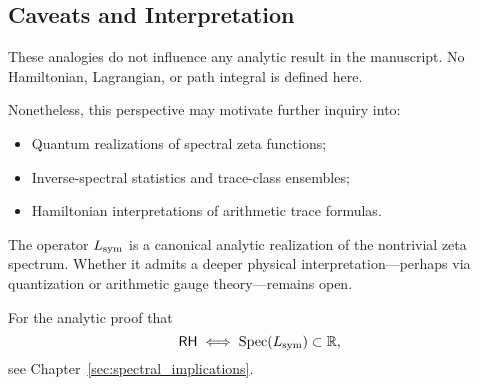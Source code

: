 \subsection*{Caveats and Interpretation}

These analogies do not influence any analytic result in the manuscript. No Hamiltonian, Lagrangian, or path integral is defined here.

Nonetheless, this perspective may motivate further inquiry into:
\begin{itemize}
  \item Quantum realizations of spectral zeta functions;
  \item Inverse-spectral statistics and trace-class ensembles;
  \item Hamiltonian interpretations of arithmetic trace formulas.
\end{itemize}

\medskip
\noindent
The operator \( L_{\mathrm{sym}} \) is a canonical analytic realization of the nontrivial zeta spectrum. Whether it admits a deeper physical interpretation—perhaps via quantization or arithmetic gauge theory—remains open.

\medskip
\noindent
For the analytic proof that
\[
\mathsf{RH} \iff \operatorname{Spec}(L_{\mathrm{sym}}) \subset \mathbb{R},
\]
see Chapter~\ref{sec:spectral_implications}.
